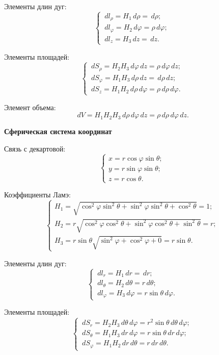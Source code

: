 	Элементы длин дуг:
	\[ \left\{ \begin{array}{l}
	\,d l_\rho = H_1\,d\rho = \,d\rho; \\
	\,d l_\varphi = H_2\,d\varphi = \rho\,d\varphi; \\
	\,d l_z = H_3\,d z = \,d z.
	\end{array} \right. \]
	
	Элементы площадей:
	\[ \left\{ \begin{array}{l}
	\,d S_\rho = H_2H_3\,d\varphi\,d z = \rho\,d\varphi\,d z; \\
	\,d S_\varphi = H_1H_3\,d\rho\,d z = \,d\rho\,d z; \\
	\,d S_z = H_1H_2\,d\rho\,d\varphi = \rho\,d\rho\,d\varphi.
	\end{array} \right. \]
	
	Элемент объема:
	\[ \,d V = H_1H_2H_3\,d\rho\,d\varphi\,d z = \rho\,d\rho\,d\varphi\,d z. \]

	\textbf{Сферическая система координат}
	
	Связь с  декартовой:
	\[ \left\{ \begin{array}{l}
		x = r\cos\varphi\sin\theta; \\
		y = r\sin\varphi\sin\theta; \\
		z = r\cos\theta.
	\end{array}\right. \]
	
	Коэффициенты Ламэ:
	\[ \left\{ \begin{array}{l}
	H_1 = \sqrt{\cos^2\varphi\sin^2\theta + \sin^2\varphi\sin^2\theta + \cos^2\theta} = 1; \\
	H_2 = r\sqrt{\cos^2\varphi\cos^2\theta + \sin^2\varphi\cos^2\theta + \sin^2\theta} = r; \\
	H_3 = r\sin\theta\sqrt{\sin^2\varphi + \cos^2\varphi + 0} = r\sin\theta.
	\end{array} \right. \]
	
	Элементы длин дуг:
	\[ \left\{ \begin{array}{l}
	\,d l_r = H_1\,d r = \,d r; \\
	\,d l_\theta = H_2\,d\theta = r\,d\theta; \\
	\,d l_\varphi = H_3\,d\varphi = r\sin\theta\,d\varphi.
	\end{array} \right. \]
	
	Элементы площадей:
	\[ \left\{ \begin{array}{l}
	\,d S_r = H_2H_3\,d\theta\,d\varphi = r^2\sin\theta\,d\theta\,d\varphi; \\
	\,d S_\theta = H_1H_3\,d r\,d\varphi = r\sin\theta\,d r\,d\varphi; \\
	\,d S_\varphi = H_1H_2\,d r\,d\theta = r\,d r\,d\theta.
	\end{array} \right. \]
	
